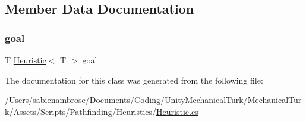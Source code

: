 \subsection{Member Data Documentation}
\mbox{\label{class_heuristic_a9b7078c615bf30ac77f026a737d6169a}} 
\subsubsection{\texorpdfstring{goal}{goal}}
{\footnotesize\ttfamily T \mbox{\hyperlink{class_heuristic}{Heuristic}}$<$ T $>$.goal}



The documentation for this class was generated from the following file\+:\begin{DoxyCompactItemize}
\item 
/\+Users/sabienambrose/\+Documents/\+Coding/\+Unity\+Mechanical\+Turk/\+Mechanical\+Turk/\+Assets/\+Scripts/\+Pathfinding/\+Heuristics/\mbox{\hyperlink{_heuristic_8cs}{Heuristic.\+cs}}\end{DoxyCompactItemize}
